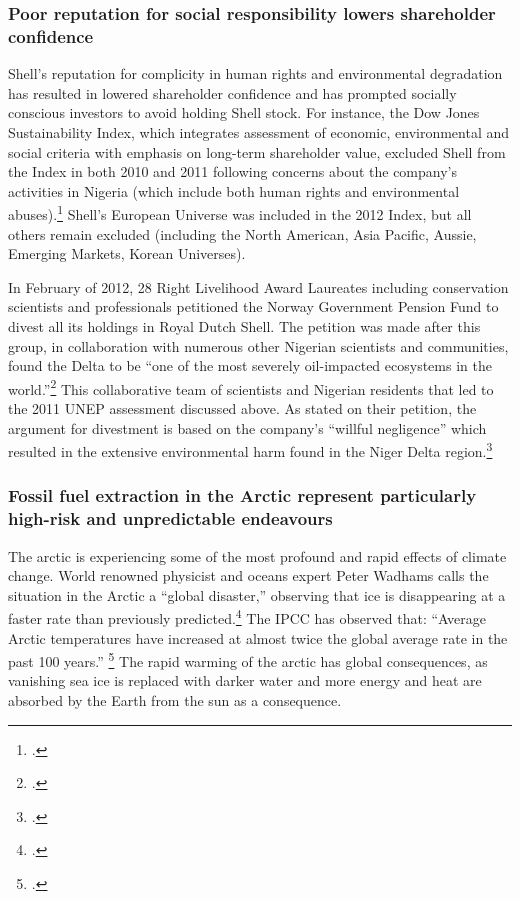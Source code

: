 	
	
	\subsubsection{Poor reputation for social responsibility lowers shareholder confidence}
	

	
Shell's reputation for complicity in human rights and environmental degradation has resulted in lowered shareholder confidence and has prompted socially conscious investors to avoid holding Shell stock.
For instance, the Dow Jones Sustainability Index, which integrates assessment of economic, environmental and social criteria with emphasis on long-term shareholder value, excluded Shell from the Index in both 2010 and 2011 following concerns about the company's activities in Nigeria (which include both human rights and environmental abuses).\footcite{ShellIndex}
Shell's European Universe was included in the 2012 Index, but all others remain excluded (including the North American, Asia Pacific, Aussie, Emerging Markets, Korean Universes).


In February of 2012, 28 Right Livelihood Award Laureates including conservation scientists and professionals petitioned the Norway Government Pension Fund to divest all its holdings in Royal Dutch Shell. 
The petition was made after this group, in collaboration with numerous other Nigerian scientists and communities, found the Delta to be ``one of the most severely oil-impacted ecosystems in the world.''\footcite[][]{NigerDeltaReport_2006}
This collaborative team of scientists and Nigerian residents that led to the 2011 UNEP assessment discussed above.
As stated on their petition, the argument for divestment is based on the company's ``willful negligence'' which resulted in the extensive environmental harm found in the Niger Delta region.\footcite[][]{NorwayPetition_2012}



	\subsubsection{Fossil fuel extraction in the Arctic represent particularly high-risk and unpredictable endeavours}



The arctic is experiencing some of the most profound and rapid effects of climate change.
World renowned physicist and oceans expert Peter Wadhams calls the situation in the Arctic a ``global disaster,'' observing that ice is disappearing at a faster rate than previously predicted.\footcite{Wadhams2012}
The IPCC has observed that: ``Average Arctic temperatures have increased at almost twice the global average rate in the past 100 years.'' \footcite[][Climate Change 2007: Synthesis Report - Observed changes in climate and their effects]{IPCC2007}
The rapid warming of the arctic has global consequences, as vanishing sea ice is replaced with darker water and more energy and heat are absorbed by the Earth from the sun as a consequence.


